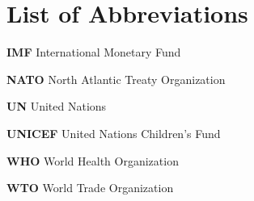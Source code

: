 \chapter*{List of Abbreviations}

\begin{abbrv}

\item[\textbf{IMF}] International Monetary Fund

\item[\textbf{NATO}] North Atlantic Treaty Organization

\item[\textbf{UN}] United Nations

\item[\textbf{UNICEF}] United Nations Children's Fund

\item[\textbf{WHO}] World Health Organization

\item[\textbf{WTO}] World Trade Organization

\end{abbrv} 
